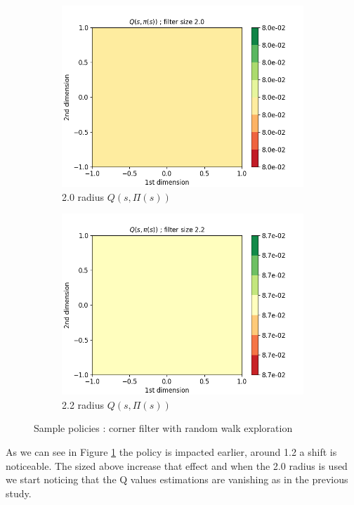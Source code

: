 \documentclass{article}
\begin{document}
\begin{figure}[H]
\begin{subfigure}[b]{0.3\linewidth}
    \includegraphics[width=\linewidth]{Study_2/2.4/visualizations/Q_contour_2_0.png}
      \caption{2.0 radius $Q(s, \Pi(s))$}
  \end{subfigure}
    \begin{subfigure}[b]{0.3\linewidth}
    \includegraphics[width=\linewidth]{Study_2/2.4/visualizations/Q_contour_2_2.png}
      \caption{2.2 radius $Q(s, \Pi(s))$}
  \end{subfigure}
  \caption{Sample policies : corner filter with random walk exploration}
  \label{fig:corner_contour_random_walk}
\end{figure}

 As we can see in Figure \ref{fig:corner_contour_random_walk} the policy is impacted earlier, around 1.2 a shift is noticeable. The sized above increase that effect and when the 2.0 radius is used we start noticing that the Q values estimations are vanishing as in the previous study.
 
\end{document}
